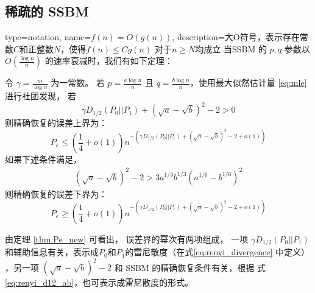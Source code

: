 \subsection{稀疏的 SSBM }
{
  type=notation,
  name={$f(n)=O(g(n))$},
  description={大O符号，表示存在常数$C$和正整数$N$，使得$f(n)\leq C g(n)$ 对于$n\geq N$均成立}
}
当SSBM 的 $p,q$ 参数以 $O(\frac{ \log n}{n})$
的速率衰减时，我们有如下定理：
\begin{theorem}\label{thm:Pe_new}
    令
    $\gamma = \frac{ m}{\log n}$
    为一常数。
    若
    $p = \frac{a \log n }{n} $ 且 $q = 
    \frac{b \log n } {n}$，使用最大似然估计量 \eqref{eq:mle}
    进行社团发现，
    若
    \begin{equation}\label{eq:positive_condition_new}
    \gamma D_{1/2}(P_0||P_1) +
     \left(\sqrt{a} - \sqrt{b}\right)^2-2 > 0
    \end{equation}
    则精确恢复的误差上界为：
    \begin{equation}\label{eq:PeMain}
    P_e \leq \left(\frac{1}{4}+o(1) \right) n^{-\left(\gamma D_{1/2}(P_0||P_1) + \left(\sqrt{a} - \sqrt{b}\right)^2-2 + o(1)\right) }
    \end{equation}
    如果下述条件满足，
    \begin{align}
    \left(\sqrt{a} - \sqrt{b}\right)^2-2 
    > 3a^{1/3}b^{1/3}\left(a^{1/6} - b^{1/6}\right)^2\label{eq:oneC}
    \end{align}
    则精确恢复的误差下界为：
    \begin{equation}\label{eq:PeMainL}
    P_e \geq \left(\frac{1}{4}+o(1) \right) n^{-\left(\gamma D_{1/2}(P_0||P_1) + \left(\sqrt{a} - \sqrt{b}\right)^2-2 + o(1)\right)}
    \end{equation}
\end{theorem}

由定理 \ref{thm:Pe_new} 可看出，
误差界的幂次有两项组成，
一项 $\gamma D_{1/2}(P_0||P_1) $ 
和辅助信息有关，表示成$P_0$和$P_1$的雷尼散度（在式\eqref{eq:renyi_divergence}
中定义）
，另一项 $ \left(\sqrt{a} - \sqrt{b}\right)^2-2 $
和 SSBM 的精确恢复条件有关，根据
式\eqref{eq:renyi_d12_ab}，也可表示成雷尼散度的形式。

